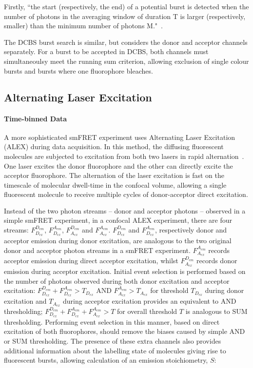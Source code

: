 Firstly, ``the start (respectively, the end) of a potential burst is detected when the number of photons in the averaging window of duration T is larger (respectively, smaller) than the minimum number of photons M."~\cite{nir06}.

The DCBS burst search is similar, but considers the donor and acceptor channels separately. For a burst to be accepted in DCBS, both channels must simultaneoulsy meet the running sum criterion, allowing exclusion of single colour bursts and bursts where one fluorophore bleaches.

\subsection{Alternating Laser Excitation}
\paragraph{Time-binned Data}
A more sophisticated smFRET experiment uses Alternating Laser Excitation (ALEX) during data acquisition. In this method, the diffusing fluorescent molecules are subjected to excitation from both two lasers in rapid alternation~\cite{kapanidis05}. One laser excites the donor fluorophore and the other can directly excite the acceptor fluorophore. The alternation of the laser excitation is fast on the timescale of molecular dwell-time in the confocal volume, allowing a single fluorescent molecule to receive multiple cycles of donor-acceptor direct excitation.

Instead of the two photon streams -- donor and acceptor photons -- observed in a simple smFRET experiment, in a confocal ALEX experiment, there are four streams: $F_{D_{ex}}^{D_{em}}$, $F_{D_{ex}}^{A_{em}}$, $F_{A_{ex}}^{D_{em}}$ and $F_{A_{ex}}^{A_{em}}$. $F_{D_{ex}}^{D_{em}}$ and $F_{D_{ex}}^{A_{em}}$, respectively donor and acceptor emission during donor excitation, are analogous to the two original donor and acceptor photon streams in a smFRET experiment. $F_{A_{ex}}^{A_{em}}$ records acceptor emission during direct acceptor excitation, whilst $F_{A_{ex}}^{D_{em}}$ records donor emission during acceptor excitation. Initial event selection is performed based on the number of photons observed during both donor excitation and acceptor excitation: $F_{D_{ex}}^{D_{em}} + F_{D_{ex}}^{A_{em}} > T_{D_{ex}}$ AND $F_{A_{ex}}^{A_{em}} > T_{A_{ex}}$ for threshold $T_{D_{ex}}$ during donor excitation and $T_{A_{ex}}$ during acceptor excitation provides an equivalent to AND thresholding; $F_{D_{ex}}^{D_{em}} + F_{D_{ex}}^{A_{em}} + F_{A_{ex}}^{A_{em}} > T$ for overall threshold $T$ is analogous to SUM thresholding. Performing event selection in this manner, based on direct excitation of both fluorophores, should remove the biases caused by simple AND or SUM thresholding. The presence of these extra channels also provides additional information about the labelling state of molecules giving rise to fluorescent bursts, allowing calculation of an emission stoichiometry, $S$:

